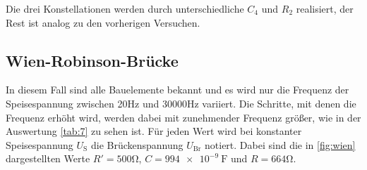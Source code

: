 Die drei Konstellationen werden durch unterschiedliche $C_4$ und $R_2$ realisiert, der Rest ist 
analog zu den vorherigen Versuchen.

\subsection{Wien-Robinson-Brücke}
\label{sec:wien}
In diesem Fall sind alle Bauelemente bekannt und es wird nur die Frequenz der Speisespannung
zwischen 20\si{\hertz} und 30000\si{\hertz} variiert. Die Schritte, mit denen die Frequenz erhöht
wird, werden dabei mit zunehmender Frequenz größer, wie in der Auswertung \ref{tab:7} zu sehen ist.
Für jeden Wert wird bei konstanter Speisespannung $U_{\text{S}}$ die Brückenspannung $U_{\text{Br}}$ notiert. 
Dabei sind die in \ref{fig:wien} dargestellten Werte $R'=500\si{\ohm}$, $C=\SI{994e-9}{\farad}$ und $R=664\si{\ohm}$.


